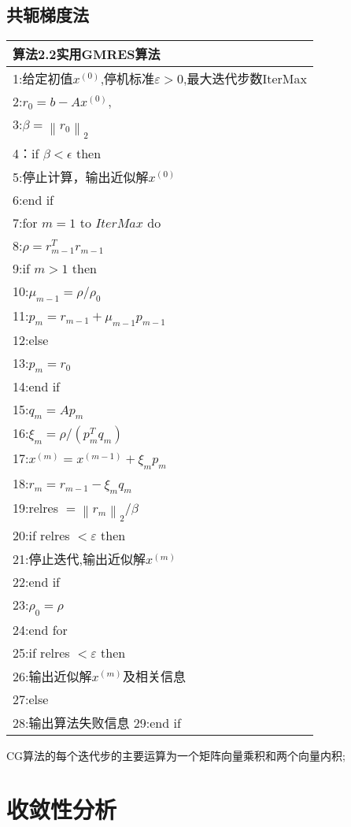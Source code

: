 \documentclass[12pt,a4paper]{article}
\begin{document}
\subsection*{共轭梯度法}
\begin{tabular}{l}
\hline
{\color{blue}算法2.2}实用GMRES算法\\
\hline
1:给定初值$x^{(0)}$,停机标准$\varepsilon>0$,最大迭代步数IterMax\\
2:$r_{0}=b-A x^{(0)},$\\
3:$\beta=\left\|r_{0}\right\|_{2}$\\
4：if $\beta< \epsilon$ then\\
5:\qquad 停止计算，输出近似解$x^{(0)}$\\
6:end if\\
7:for $m=1$ to $IterMax$ do\\
8:\qquad $\rho=r_{m-1}^{T} r_{m-1}$\\
9:\qquad if $m>1$ then\\
10:\qquad \qquad $\mu_{m-1}=\rho / \rho_{0}$\\
11:\qquad \qquad $p_{m}=r_{m-1}+\mu_{m-1} p_{m-1}$\\
12:\qquad else\\
13:\qquad \qquad $p_{m}=r_{0}$\\
14:\qquad end if\\
15:\qquad $q_{m}=A p_{m}$\\
16:\qquad $\xi_{m}=\rho /\left(p_{m}^{T} q_{m}\right)$\\
17:\qquad $x^{(m)}=x^{(m-1)}+\xi_{m} p_{m}$\\
18:\qquad $r_{m}=r_{m-1}-\xi_{m} q_{m}$\\
19:\qquad relres $=\left\|r_{m}\right\|_{2} / \beta$\\
20:\qquad if relres $<\varepsilon$ then\\
21:\qquad \qquad 停止迭代,输出近似解$x^{(m)}$\\
22:\qquad end if\\
23:\qquad $\rho_{0}=\rho$\\
24:end for\\
25:if relres $<\varepsilon$ then\\
26:\qquad 输出近似解$x^{(m)}$及相关信息\\
27:else\\
28:\qquad 输出算法失败信息
29:end if\\
\hline
\end{tabular}
CG算法的每个迭代步的主要运算为一个矩阵向量乘积和两个向量内积;\\
\section{收敛性分析}
\end{document}

